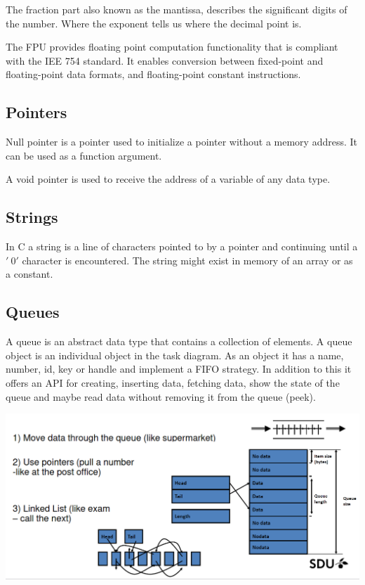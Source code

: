 The fraction part also known as the mantissa, describes
the significant digits of the number.
Where the exponent tells us where the decimal point is.



The FPU provides floating point computation functionality
that is compliant with the IEE 754 standard.
It enables conversion between fixed-point and floating-point data
formats, and floating-point constant instructions.

\subsection{Pointers}
Null pointer is a pointer used to initialize a pointer without
a memory address. It can be used as a function argument.

A void pointer is used to receive the address of a variable
of any data type.

\subsection{Strings}
In C a string is a line of characters pointed to by a pointer and
continuing until a $'\ 0'$ character is encountered.
The string might exist in memory of an array or as a constant.


\subsection{Queues}

A queue is an abstract data type that contains a collection of elements.
A queue object is an individual object in the task diagram.
As an object it has a name, number, id, key or handle and implement
a FIFO strategy. In addition to this it offers an API for
creating, inserting data, fetching data, show the state of the queue and
maybe read data without removing it from the queue (peek).


\begin{center}
	\includegraphics[width=\textwidth]{images/queue.png}
\end{center}

